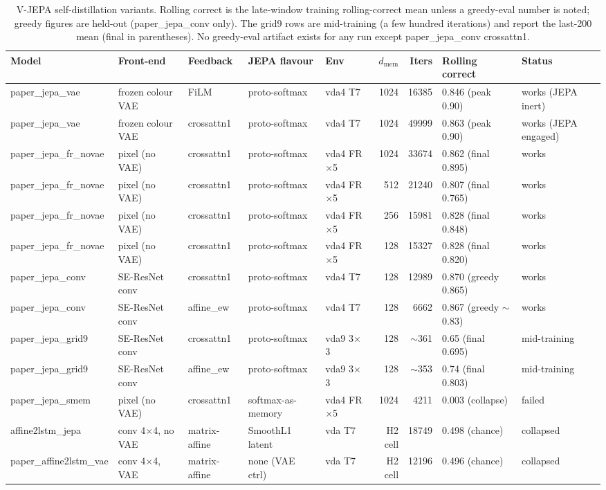 \begin{table}[t]
\centering
\small
\begin{tabular}{@{}lllllrrll@{}}
\toprule
Model & Front-end & Feedback & JEPA flavour & Env & $d_{\text{mem}}$ & Iters & Rolling correct & Status \\
\midrule
paper\_jepa\_vae & frozen colour VAE & FiLM & proto-softmax & vda4 T7 & 1024 & 16385 & 0.846 (peak 0.90) & works (JEPA inert) \\
paper\_jepa\_vae & frozen colour VAE & crossattn1 & proto-softmax & vda4 T7 & 1024 & 49999 & 0.863 (peak 0.90) & works (JEPA engaged) \\
paper\_jepa\_fr\_novae & pixel (no VAE) & crossattn1 & proto-softmax & vda4 FR$\times$5 & 1024 & 33674 & 0.862 (final 0.895) & works \\
paper\_jepa\_fr\_novae & pixel (no VAE) & crossattn1 & proto-softmax & vda4 FR$\times$5 & 512 & 21240 & 0.807 (final 0.765) & works \\
paper\_jepa\_fr\_novae & pixel (no VAE) & crossattn1 & proto-softmax & vda4 FR$\times$5 & 256 & 15981 & 0.828 (final 0.848) & works \\
paper\_jepa\_fr\_novae & pixel (no VAE) & crossattn1 & proto-softmax & vda4 FR$\times$5 & 128 & 15327 & 0.828 (final 0.820) & works \\
paper\_jepa\_conv & SE-ResNet conv & crossattn1 & proto-softmax & vda4 T7 & 128 & 12989 & 0.870 (greedy 0.865) & works \\
paper\_jepa\_conv & SE-ResNet conv & affine\_ew & proto-softmax & vda4 T7 & 128 & 6662 & 0.867 (greedy $\sim$0.83) & works \\
paper\_jepa\_grid9 & SE-ResNet conv & crossattn1 & proto-softmax & vda9 3$\times$3 & 128 & $\sim$361 & 0.65 (final 0.695) & mid-training \\
paper\_jepa\_grid9 & SE-ResNet conv & affine\_ew & proto-softmax & vda9 3$\times$3 & 128 & $\sim$353 & 0.74 (final 0.803) & mid-training \\
paper\_jepa\_smem & pixel (no VAE) & crossattn1 & softmax-as-memory & vda4 FR$\times$5 & 1024 & 4211 & 0.003 (collapse) & failed \\
affine2lstm\_jepa & conv 4$\times$4, no VAE & matrix-affine & SmoothL1 latent & vda T7 & H2 cell & 18749 & 0.498 (chance) & collapsed \\
paper\_affine2lstm\_vae & conv 4$\times$4, VAE & matrix-affine & none (VAE ctrl) & vda T7 & H2 cell & 12196 & 0.496 (chance) & collapsed \\
\bottomrule
\end{tabular}
\caption{V-JEPA self-distillation variants. Rolling correct is the late-window training
rolling-correct mean unless a greedy-eval number is noted; greedy figures are held-out
(paper\_jepa\_conv only). The grid9 rows are mid-training (a few hundred iterations) and
report the last-200 mean (final in parentheses). No greedy-eval artifact exists for any run
except paper\_jepa\_conv crossattn1.}
\label{tab:jepa}
\end{table}

